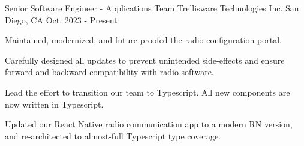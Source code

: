 

\begin{cventries}

  \cventry
    {Senior Software Engineer - Applications Team}
    {
      \hspace{0.7em}Trellisware Technologies Inc.
    }
    {San Diego, CA}
    {Oct. 2023 - Present}
    {\begin{cvitems}
      \item {
        Maintained, modernized, and future-proofed the radio configuration portal.
      }
      \item {
        Carefully designed all updates to prevent unintended
        side-effects and ensure forward and backward compatibility with radio
        software.
      }
      \item{Lead the effort to transition our team to Typescript. All new components are now written in Typescript.}
      \item{
        Updated our React Native radio communication app to a modern RN version, 
        and re-architected to almost-full Typescript type coverage.
      }
    \end{cvitems}}


\end{cventries}
